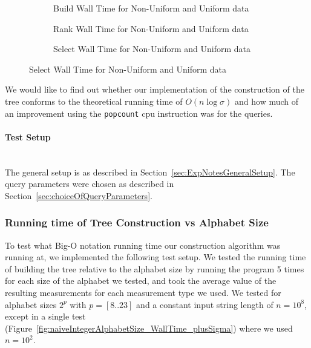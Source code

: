 \begin{figure}\tiny
	\begin{subfigure}{0.48\textwidth}
		
		\caption{Build Wall Time for Non-Uniform and Uniform data}
		\label{fig:UniformVsNonUniform_Build_WallTime}
	\end{subfigure}
	\hfill
	\begin{subfigure}{0.48\textwidth}
		
		\caption{Rank Wall Time for Non-Uniform and Uniform data}
		\label{fig:UniformVsNonUniform_Build_WallTime}
	\end{subfigure}	
	
	\begin{subfigure}{0.48\textwidth}
		
		\caption{Select Wall Time for Non-Uniform and Uniform data}
		\label{fig:naiveIntegerAlphabetSize_BMRate}
	\end{subfigure}
	\hfill
\end{figure}
\restoregeometry


We would like to find out whether our implementation of the construction of the tree conforms to the theoretical running time of $O(n \log \sigma)$ and how much of an improvement using the \texttt{popcount} cpu instruction was for the queries.

\paragraph{Test Setup}~\\
The general setup is as described in Section~\ref{sec:ExpNotesGeneralSetup}.
The query parameters were chosen as described in Section~\ref{sec:choiceOfQueryParameters}.

\subsubsection{Running time of Tree Construction vs Alphabet Size}
To test what Big-O notation running time our construction algorithm was running at, we implemented the following test setup.
We tested the running time of building the tree relative to the alphabet size by running the program 5 times for each size of the alphabet we tested, and took the average value of the resulting measurements for each measurement type we used.
We tested for alphabet sizes $2^p$ with $p = [8..23]$ and a constant input string length of $n = 10^8$, except in a single test (Figure~\ref{fig:naiveIntegerAlphabetSize_WallTime_plusSigma}) where we used $n = 10^2$.

